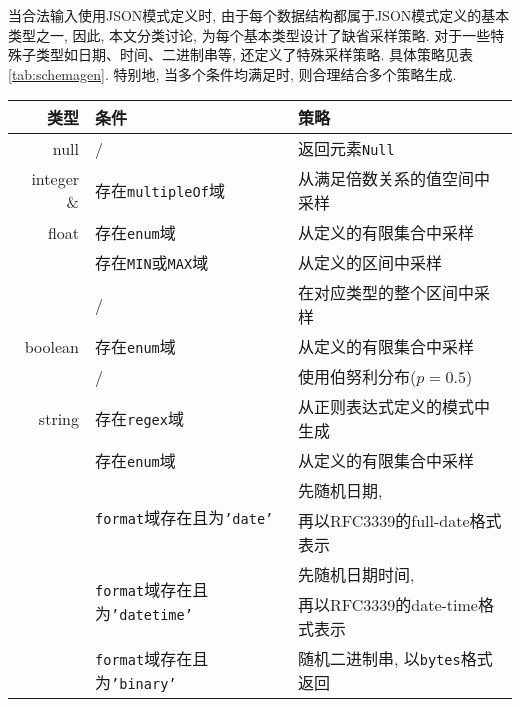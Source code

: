             当合法输入使用JSON模式定义时, 由于每个数据结构都属于JSON模式定义的基本类型之一, 因此, 本文分类讨论, 为每个基本类型设计了缺省采样策略. 对于一些特殊子类型如日期、时间、二进制串等, 还定义了特殊采样策略. 具体策略见表\ref{tab:schemagen}. 特别地, 当多个条件均满足时, 则合理结合多个策略生成.
            
            \begin{table}[]
                \centering
                \begin{tabular}{rll}
                    \toprule
                    类型 & 条件 & 策略 \\
                    \midrule
                    null & / & 返回元素\texttt{Null} \\
                    \hline
                    integer \& & 存在\texttt{multipleOf}域 & 从满足倍数关系的值空间中采样 \\
                    \cline{2-3}
                    float & 存在\texttt{enum}域 & 从定义的有限集合中采样 \\
                    \cline{2-3}
                    & 存在\texttt{MIN}或\texttt{MAX}域 & 从定义的区间中采样 \\
                    \cline{2-3}
                    & / & 在对应类型的整个区间中采样 \\
                    \hline
                    boolean & 存在\texttt{enum}域 & 从定义的有限集合中采样 \\
                    \cline{2-3}
                    & / & 使用伯努利分布($p=0.5$) \\
                    \hline
                    string & 存在\texttt{regex}域 & 从正则表达式定义的模式中生成 \\
                    \cline{2-3}
                    & 存在\texttt{enum}域 & 从定义的有限集合中采样 \\
                    \cline{2-3}
                    & \multirow{2}{*}{\texttt{format}域存在且为\texttt{'date'}} & 先随机日期, \\
                    & & 再以RFC3339的full-date格式表示 \\
                    \cline{2-3}
                    & \multirow{2}{*}{\texttt{format}域存在且为\texttt{'datetime'}} & 先随机日期时间, \\
                    & & 再以RFC3339的date-time格式表示 \\
                    \cline{2-3}
                    & \texttt{format}域存在且为\texttt{'binary'} & 随机二进制串, 以\texttt{bytes}格式返回 \\

\end{tabular}
\end{table}
